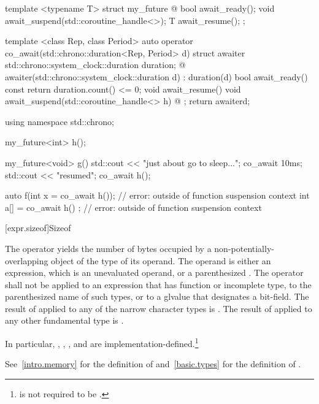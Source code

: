 \pnum
\begin{example}
\begin{codeblock}
template <typename T>
struct my_future {
  @\commentellip@
  bool await_ready();
  void await_suspend(std::coroutine_handle<>);
  T await_resume();
};

template <class Rep, class Period>
auto operator co_await(std::chrono::duration<Rep, Period> d) {
  struct awaiter {
    std::chrono::system_clock::duration duration;
    @\commentellip@
    awaiter(std::chrono::system_clock::duration d) : duration(d) {}
    bool await_ready() const { return duration.count() <= 0; }
    void await_resume() {}
    void await_suspend(std::coroutine_handle<> h) { @\commentellip@ }
  };
  return awaiter{d};
}

using namespace std::chrono;

my_future<int> h();

my_future<void> g() {
  std::cout << "just about go to sleep...\n";
  co_await 10ms;
  std::cout << "resumed\n";
  co_await h();
}

auto f(int x = co_await h());   // error:  outside of function suspension context
int a[] = { co_await h() };     // error:  outside of function suspension context
\end{codeblock}
\end{example}

[expr.sizeof]{Sizeof}

\pnum
{}%
%
%
The  operator yields the number of bytes
occupied by a non-potentially-overlapping object of the type
of its operand. The operand is either an expression,
which is an unevaluated operand, or a parenthesized
.
%
The  operator shall not be applied to an expression that
has function or incomplete type,
to the parenthesized name of such
types, or to a glvalue that designates a bit-field.
The result of 
applied to any of the narrow character types is .
The result of
 applied to any other fundamental
type is .
\begin{note}
In particular, , ,
, and  are
implementation-defined.\footnote{ is not required to be .}
\end{note}
\begin{note}
See~\ref{intro.memory} for the definition of 
and~\ref{basic.types} for the definition of .
\end{note}


